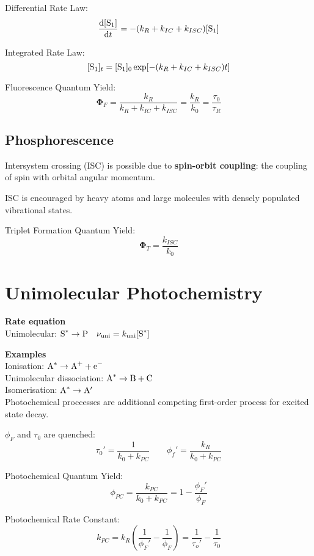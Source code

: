 Differential Rate Law:
$$\frac{\mathrm{d}[\ce{S}_1]}{\mathrm{d}t} = -(k_R +k_{IC} +k_{ISC}) [\ce{S}_1]$$

Integrated Rate Law:
$$[\ce{S}_1]_t = [\ce{S}_1]_0 \exp[-(k_R + k_{IC} + k_{ISC})t]$$

Fluorescence Quantum Yield:
$$\mathbf{\Phi}_F = \frac{k_R}{k_R + k_{IC} + k_{ISC}} = \frac{k_R}{k_0} = \frac{\tau_0}{\tau_R}$$

\subsection*{Phosphorescence}

Intersystem crossing (ISC) is possible due to \textbf{spin-orbit coupling}: the coupling of  spin
with orbital angular momentum.

ISC is encouraged by heavy atoms and large molecules with densely populated vibrational states.
\vspace{\baselineskip}

Triplet Formation Quantum Yield:
$$\mathbf{\Phi}_T = \frac{k_{ISC}}{k_0}$$

\section{Unimolecular Photochemistry}

\textbf{Rate equation} \\
Unimolecular: $\ce{S^*} \rightarrow \ce{P} \quad \nu_{\mathrm{uni}} = k_{\mathrm{uni}}[\ce{S^*}]$
\vspace{\baselineskip}

\textbf{Examples} \\
Ionisation: $\ce{A^*} \rightarrow \ce{A+} + \ce{e-}$ \\
Unimolecular dissociation: $\ce{A^{*}} \rightarrow \ce{B} + \ce{C}$ \\
Isomerisation: $\ce{A^*} \rightarrow \ce{A}'$ \\

Photochemical proccesses are additional competing first-order process for excited state decay.
\vspace{\baselineskip}

$\phi_F$ and $\tau_0$ are quenched: 
$$\tau_0' = \frac{1}{k_0 + k_{PC}} \qquad \phi_f' = \frac{k_R}{k_0 + k_{PC}}$$

Photochemical Quantum Yield:
$$\phi_{PC} = \frac{k_{PC}}{k_0 + k_{PC}} = 1 - \frac{\phi_F'}{\phi_F}$$

Photochemical Rate Constant:
$$k_{PC} = k_R \left( \frac{1}{\phi_F'} - \frac{1}{\phi_F}\right) = \frac{1}{\tau_o'}- \frac{1}{\tau_0}$$

